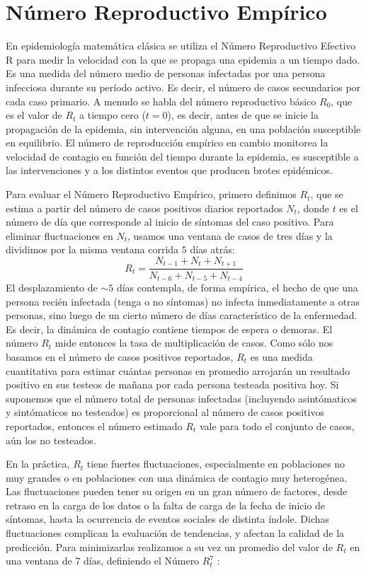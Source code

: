 \documentclass[12pt,a4paper]{article}
\begin{document}
\section*{Número Reproductivo Empírico}
En epidemiología matemática clásica se utiliza el Número Reproductivo Efectivo 
{\cal R} para medir la velocidad con la que se propaga una epidemia a un tiempo dado. 
Es una medida del número medio de personas infectadas por una persona 
infecciosa durante su período activo. Es decir, el número de casos secundarios por cada caso primario. 
A menudo se habla del número reproductivo básico $R_0$, que es el valor 
de $R_t$ a tiempo cero ($t=0$), es decir, antes de que se inicie 
la propagación de la epidemia, sin intervención alguna, en una 
población susceptible en equilibrio. El número de reproducción empírico 
en cambio monitorea la velocidad de contagio en función del tiempo durante la epidemia, 
es susceptible a las intervenciones y a los distintos eventos que producen 
brotes epidémicos.


Para evaluar el Número Reproductivo Empírico, primero definimos $R_t$, que
se estima a partir del número de casos positivos diarios reportados $N_t$, 
donde $t$ es el número de día que corresponde al inicio de síntomas del caso 
positivo. Para eliminar fluctuaciones en $N_t$, usamos una 
ventana de casos de tres días y la dividimos por la misma ventana corrida $5$ 
días atrás:
\begin{equation}
R_t = \frac{N_{t-1}+N_{t}+N_{t+1}}{N_{t-6}+N_{t-5}+N_{t-4}}
\end{equation}
El desplazamiento de $\sim 5$ días contempla, 
de forma empírica, el hecho de que una persona recién 
infectada (tenga o no síntomas) no infecta inmediatamente a otras personas, 
sino luego de un cierto número de días característico de la enfermedad.
Es decir, la dinámica de contagio contiene tiempos de espera o demoras. 
El número $R_t$ mide entonces 
la tasa de multiplicación de casos. Como sólo nos basamos 
en el número de casos positivos reportados, $R_t$ es una medida 
cuantitativa para estimar cuántas personas en promedio arrojarán un 
resultado positivo en sus testeos de mañana por cada 
persona testeada positiva hoy. Si suponemos que el número total 
de personas infectadas (incluyendo asintómaticos y sintómaticos no testeados) 
es proporcional al número de casos positivos reportados, entonces el número estimado
$R_t$ vale para todo el conjunto de casos, aún los no testeados.



En la práctica, $R_t$ tiene fuertes fluctuaciones, especialmente en poblaciones 
no muy grandes o en poblaciones con una dinámica de contagio muy heterogénea. 
Las fluctuaciones pueden tener su origen en un gran número de factores, 
desde retraso en la carga de los datos o la falta de carga de la 
fecha de inicio de síntomas, hasta la ocurrencia de eventos sociales de distinta índole. 
Dichas fluctuaciones complican la evaluación de tendencias, y afectan la calidad de la 
predicción. Para minimizarlas realizamos a su vez 
un promedio del valor de $R_t$ en una ventana de 7 días, 
definiendo el Número $R^7_t$ :
\end{document}

